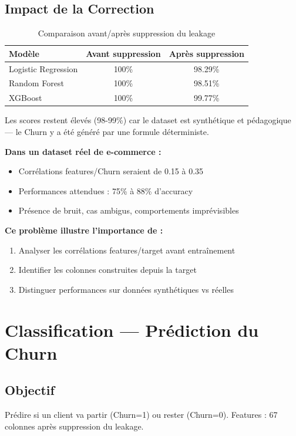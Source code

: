 \documentclass[11pt,a4paper]{article}
\begin{document}
\subsection{Impact de la Correction}
\begin{table}[H]
	\centering
	\caption{Comparaison avant/après suppression du leakage}
	\label{tab:leakage_impact}
	\begin{tabular}{|l|c|c|}
		\hline
		\textbf{Modèle} & \textbf{Avant suppression} & \textbf{Après suppression} \\
		\hline
		Logistic Regression & 100\% & 98.29\% \\
		Random Forest & 100\% & 98.51\% \\
		XGBoost & 100\% & 99.77\% \\
		\hline
	\end{tabular}
\end{table}
\begin{tcolorbox}[colback=warningred!10, colframe=warningred, title=\textbf{Conclusion Méthodologique}]
	Les scores restent élevés (98-99\%) car le dataset est synthétique et pédagogique — le Churn y a été généré par une formule déterministe.
	
	\textbf{Dans un dataset réel de e-commerce :}
	\begin{itemize}
		\item Corrélations features/Churn seraient de 0.15 à 0.35
		\item Performances attendues : 75\% à 88\% d'accuracy
		\item Présence de bruit, cas ambigus, comportements imprévisibles
	\end{itemize}
	
	\textbf{Ce problème illustre l'importance de :}
	\begin{enumerate}
		\item Analyser les corrélations features/target avant entraînement
		\item Identifier les colonnes construites depuis la target
		\item Distinguer performances sur données synthétiques vs réelles
	\end{enumerate}
\end{tcolorbox}

\section{Classification — Prédiction du Churn}

\subsection{Objectif}
Prédire si un client va partir (Churn=1) ou rester (Churn=0). Features : 67 colonnes après suppression du leakage.
\end{document}
